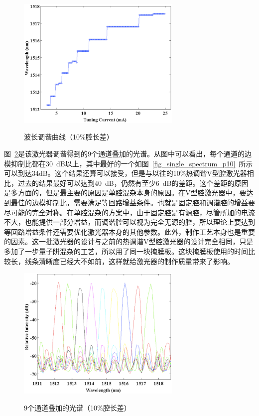 \documentclass{ZJUthesis}
\begin{document}
\begin{figure}[htbp]
  \centering
  \includegraphics[width=0.7\textwidth]{./Pictures/single_tuning_p10.eps}\\
  \caption{波长调谐曲线（10\%腔长差）}
  \label{fig_single_tuning_p10}
\end{figure}

图~\ref{fig_single_spectra_p10}是该激光器调谐得到的9个通道叠加的光谱。从图中可以看出，每个通道的边模抑制比都在30~dB以上，其中最好的一个如图~\ref{fig_single_spectrum_p10}~所示可以到达34dB。这个结果还算可以接受，但是与以往的10\%热调谐V型腔激光器相比，过去的结果最好可以达到40~dB，仍然有至少6~dB的差距。这个差距的原因是多方面的，但是最主要的原因是单腔混杂本身的原因。在V型腔激光器中，要达到最佳的边模抑制比，需要满足等回路增益条件。也就是固定腔和调谐腔的增益要尽可能的完全对称。在单腔混杂的方案中，由于固定腔是有源腔，尽管所加的电流不大，也能提供一部分增益，而调谐腔可以视为完全无源的腔，所以理论上要达到等回路增益条件还需要优化激光器本身的其他参数。此外，制作工艺本身也是重要的因素。这一批激光器的设计与之前的热调谐V型腔激光器的设计完全相同，只是多加了一步量子阱混杂的工艺，所以用了同一块掩膜板。这块掩膜板使用的时间比较长，线条清晰度已经大不如前，这样就给激光器的制作质量带来了影响。

\begin{figure}[htbp]
  \centering
  \includegraphics[width=0.7\textwidth]{./Pictures/single_spectra_p10.eps}\\
  \caption{9个通道叠加的光谱（10\%腔长差）}
  \label{fig_single_spectra_p10}
\end{figure}
\end{document}
